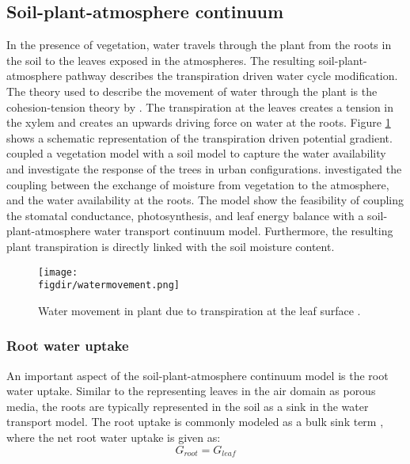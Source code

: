 \subsection{Soil-plant-atmosphere continuum}

In the presence of vegetation, water travels through the plant from the roots in the soil to the leaves exposed in the atmospheres. The resulting soil-plant-atmosphere pathway describes the transpiration driven water cycle modification. The theory used to describe the movement of water through the plant is the cohesion-tension theory by \cite{Dixon1895}. The transpiration at the leaves creates a tension in the xylem and creates an upwards driving force on water at the roots. Figure \ref{fig:watermovement} shows a schematic representation of the transpiration driven potential gradient. \cite{Bruse1998} coupled a vegetation model with a soil model to capture the water availability and investigate the response of the trees in urban configurations. \cite{Tuzet2003} investigated the coupling between the exchange of moisture from vegetation to the atmosphere, and the water availability at the roots. The model show the feasibility of coupling the stomatal conductance, photosynthesis, and leaf energy balance with a soil-plant-atmosphere water transport continuum model. Furthermore, the resulting plant transpiration is directly linked with the soil moisture content. 

	 \begin{figure}[t]
	 	\centering
	 	\texttt{[image: \\figdir/watermovement.png]}
	 	\caption{Water movement in plant due to transpiration at the leaf surface \citep{Sawinski2011}.}
	 	\label{fig:watermovement}
	 \end{figure}



\subsubsection*{Root water uptake}

An important aspect of the soil-plant-atmosphere continuum model is the root water uptake. Similar to the representing leaves in the air domain as porous media, the roots are typically represented in the soil as a sink in the water transport model. The root uptake is commonly modeled as a bulk sink term \citep{Hopmans2002,Vrugt2001}, where the net root water uptake is given as:
	 \begin{equation}
	 G_{\textit{root}} = G_{\textit{leaf}}
	 \end{equation}
	 
